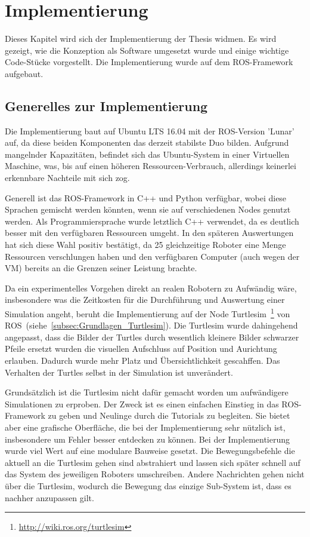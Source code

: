 \chapter{Implementierung}\label{ch:Implementierung}

Dieses Kapitel wird sich der Implementierung der Thesis widmen. Es wird gezeigt, wie die Konzeption als Software umgesetzt wurde und einige wichtige Code-Stücke vorgestellt. Die Implementierung wurde auf dem ROS-Framework aufgebaut.

\section{Generelles zur Implementierung}
Die Implementierung baut auf Ubuntu LTS 16.04 mit der ROS-Version 'Lunar' auf, da diese beiden Komponenten das derzeit stabilste Duo bilden. Aufgrund mangelnder Kapazitäten, befindet sich das Ubuntu-System in einer Virtuellen Maschine, was, bis auf einen höheren Ressourcen-Verbrauch, allerdings keinerlei erkennbare Nachteile mit sich zog.

Generell ist das ROS-Framework in C++ und Python verfügbar, wobei diese Sprachen gemischt werden könnten, wenn sie auf verschiedenen Nodes genutzt werden. Als Programmiersprache wurde letztlich C++ verwendet, da es deutlich besser mit den verfügbaren Ressourcen umgeht. In den späteren Auswertungen hat sich diese Wahl positiv bestätigt, da 25 gleichzeitige Roboter eine Menge Ressourcen verschlungen haben und den verfügbaren Computer (auch wegen der VM) bereits an die Grenzen seiner Leistung brachte.

Da ein experimentelles Vorgehen direkt an realen Robotern zu Aufwändig wäre, insbesondere was die Zeitkosten für die Durchführung und Auswertung einer Simulation angeht, beruht die Implementierung auf der Node Turtlesim~\footnote{\url{http://wiki.ros.org/turtlesim}} von ROS~(siehe~\autoref{subsec:Grundlagen_Turtlesim}). Die Turtlesim wurde dahingehend angepasst, dass die Bilder der Turtles durch wesentlich kleinere Bilder schwarzer Pfeile ersetzt wurden die visuellen Aufschluss auf Position und Aurichtung erlauben. Dadurch wurde mehr Platz und Übersichtlichkeit gescahffen. Das Verhalten der Turtles selbst in der Simulation ist unverändert.

Grundsätzlich ist die Turtlesim nicht dafür gemacht worden um aufwändigere Simulationen zu erproben. Der Zweck ist es einen einfachen Einstieg in das ROS-Framework zu geben und Neulinge durch die Tutorials zu begleiten. Sie bietet aber eine grafische Oberfläche, die bei der Implementierung sehr nützlich ist, insbesondere um Fehler besser entdecken zu können.
Bei der Implementierung wurde viel Wert auf eine modulare Bauweise gesetzt. Die Bewegungsbefehle die aktuell an die Turtlesim gehen sind abstrahiert und lassen sich später schnell auf das System des jeweiligen Roboters umschreiben. Andere Nachrichten gehen nicht über die Turtlesim, wodurch die Bewegung das einzige Sub-System ist, dass es nachher anzupassen gilt.

